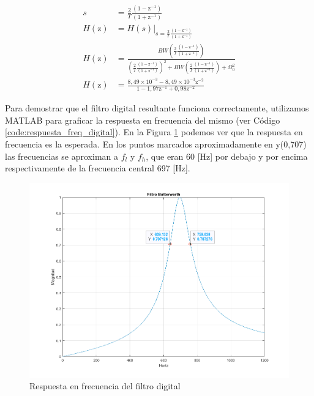 \begin{align}
  s             & = \frac{2}{T}\frac{(1-\textrm{z}^{-1})}{(1+\textrm{z}^{-1})} \label{eq:transf_s_a_z}                                                                                                                                                                     \\
  H(\textrm{z}) & = H(s)|_{s = \frac{2}{T}\frac{(1-\textrm{z}^{-1})}{(1+\textrm{z}^{-1})}}                                                                                                                                                                                 \\
  H(\textrm{z}) & = \frac{BW \left(\frac{2}{T}\frac{(1-\textrm{z}^{-1})}{(1+\textrm{z}^{-1})}\right)}{\left(\frac{2}{T}\frac{(1-\textrm{z}^{-1})}{(1+\textrm{z}^{-1})}\right)^2 + BW \left(\frac{2}{T}\frac{(1-\textrm{z}^{-1})}{(1+\textrm{z}^{-1})}\right) + \Omega_0^2} \\
  H(\textrm{z}) & = \frac{8,49\times 10^{-3} - 8,49\times 10^{-3}\textrm{z}^{-2}}{1 - 1,97\textrm{z}^{-1} + 0,98\textrm{z}^{-2}} \label{eq:filtro_digital_bp}
\end{align}

Para demostrar que el filtro digital resultante funciona correctamente, utilizamos MATLAB para graficar la respuesta en frecuencia del mismo (ver Código \ref{code:respuesta_freq_digital}). En la Figura \ref{fig:respuesta_freq_digital} podemos ver que la respuesta en frecuencia es la esperada. En los puntos marcados aproximadamente en y(0,707) las frecuencias se aproximan a $f_l$ y $f_h$, que eran 60 [Hz] por debajo y por encima respectivamente de la frecuencia central 697 [Hz].



\begin{figure}[H]
  \centering
  \includegraphics[width=\linewidth]{images/respuesta_frecuencia_digital.png}
  \caption{Respuesta en frecuencia del filtro digital}
  \label{fig:respuesta_freq_digital}
\end{figure}

